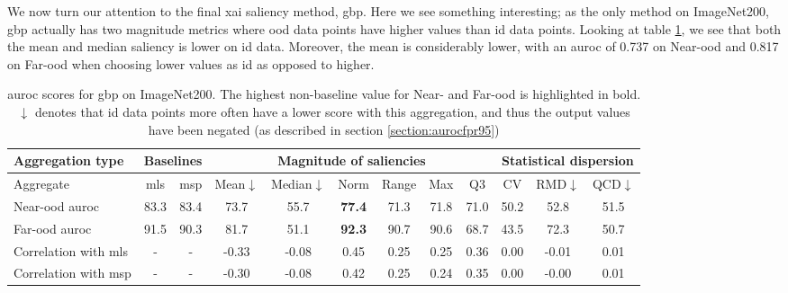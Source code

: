 \documentclass[UKenglish]{uiomasterthesis} %
\theoremstyle{definition}
\begin{document}
We now turn our attention to the final \ac{xai} saliency method, \ac{gbp}. Here we see something interesting; as the only method on ImageNet200, \ac{gbp} actually has two magnitude metrics where \ac{ood} data points have higher values than \ac{id} data points. Looking at table \ref{table:imagenet200_gbp_metrics}, we see that both the mean and median saliency is lower on \ac{id} data. Moreover, the mean is considerably lower, with an \ac{auroc} of 0.737 on Near-\ac{ood} and 0.817 on Far-\ac{ood} when choosing lower values as \ac{id} as opposed to higher.

\begin{table}[hbtp]
\setlength\tabcolsep{3pt}
\begin{center}
\begin{tabular}{ |p{5.1em}|c c|c c c c c c|c c c| }
    \hline
     \centering Aggregation type & \multicolumn{2}{c|}{Baselines} & \multicolumn{6}{c|}{Magnitude of saliencies} & \multicolumn{3}{p{8em}|}{\centering Statistical dispersion} \\
    \hline
    Aggregate & \ac{mls} & \ac{msp} & Mean$\downarrow$ & Median$\downarrow$ & Norm & Range & Max & Q3 & CV & RMD$\downarrow$ & QCD$\downarrow$  \\
    \hline
    \rowcolor{near!50}
    Near-\ac{ood} \ac{auroc} & 83.3 & 83.4 & 73.7 & 55.7 &\textbf{ 77.4 }& 71.3 & 71.8 & 71.0 & 50.2 & 52.8 & 51.5  \\
    \hline
    \rowcolor{far!50}
    Far-\ac{ood} \ac{auroc} & 91.5 & 90.3 & 81.7 & 51.1 &\textbf{ 92.3 }& 90.7 & 90.6 & 68.7 & 43.5 & 72.3 & 50.7  \\
    \hline
    Correlation with \ac{mls}& - & - & -0.33 & -0.08 & 0.45 & 0.25 & 0.25 & 0.36 & 0.00 & -0.01 & 0.01  \\
    \hline
    Correlation with \ac{msp}& - & - & -0.30 & -0.08 & 0.42 & 0.25 & 0.24 & 0.35 & 0.00 & -0.00 & 0.01  \\
    \hline
    \end{tabular}
    \caption[\ac{auroc} scores for \ac{gbp} on ImageNet200]{\ac{auroc} scores for \ac{gbp} on ImageNet200. The highest non-baseline value for Near- and Far-\ac{ood} is highlighted in bold. $\downarrow$ denotes that \ac{id} data points more often have a lower score with this aggregation, and thus the output values have been negated (as described in section \ref{section:aurocfpr95})}
    \label{table:imagenet200_gbp_metrics}
\end{center}
\setlength\tabcolsep{6pt}
\end{table}
\end{document}

